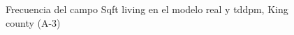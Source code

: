\begin{figure}[H]
    \centering
    
    \caption{Frecuencia del campo Sqft living en el modelo real y tddpm, King county (A-3)}
    \label{frecuency-tddpm-sqft living}
\end{figure}